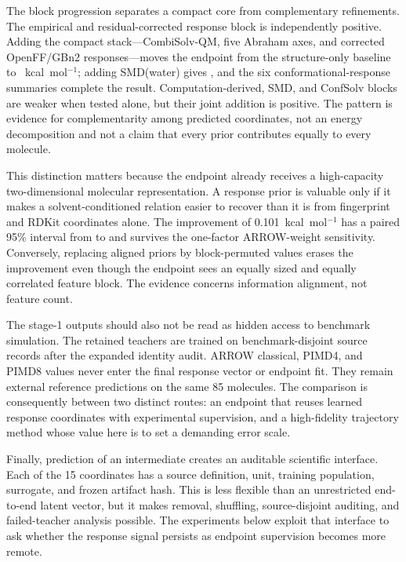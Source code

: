 \documentclass{article}
\begin{document}
The block progression separates a compact core from complementary refinements. The
empirical and residual-corrected response block is independently positive. Adding the
compact stack---CombiSolv-QM, five Abraham axes, and corrected OpenFF/GBn2
responses---moves the endpoint from the structure-only baseline to
\NarrowMAE{}~kcal~mol$^{-1}$; adding SMD(water) gives
\NarrowSMDMAE{}, and the six conformational-response summaries complete the
\SolvAIMAE{} result. Computation-derived, SMD, and ConfSolv blocks are weaker when
tested alone, but their joint addition is positive. The pattern is evidence for
complementarity among predicted coordinates, not an energy decomposition and not a
claim that every prior contributes equally to every molecule.

This distinction matters because the endpoint already receives a high-capacity
two-dimensional molecular representation. A response prior is valuable only if it
makes a solvent-conditioned relation easier to recover than it is from fingerprint
and RDKit coordinates alone. The improvement of 0.101~kcal~mol$^{-1}$ has a paired
95\% interval from \SolvAICILow{} to \SolvAICIHigh{} and survives the one-factor
ARROW-weight sensitivity. Conversely, replacing aligned priors by block-permuted
values erases the improvement even though the endpoint sees an equally sized and
equally correlated feature block. The evidence concerns information alignment, not
feature count.

The stage-1 outputs should also not be read as hidden access to benchmark simulation.
The retained teachers are trained on benchmark-disjoint source records after the
expanded identity audit. ARROW classical, PIMD4, and PIMD8 values never enter the
final response vector or endpoint fit. They remain external reference predictions on
the same 85 molecules. The comparison is consequently between two distinct routes:
an endpoint that reuses learned response coordinates with experimental supervision,
and a high-fidelity trajectory method whose value here is to set a demanding error
scale.

Finally, prediction of an intermediate creates an auditable scientific interface.
Each of the 15 coordinates has a source definition, unit, training population,
surrogate, and frozen artifact hash. This is less flexible than an unrestricted
end-to-end latent vector, but it makes removal, shuffling, source-disjoint auditing,
and failed-teacher analysis possible. The experiments below exploit that interface to
ask whether the response signal persists as endpoint supervision becomes more remote.
\end{document}
